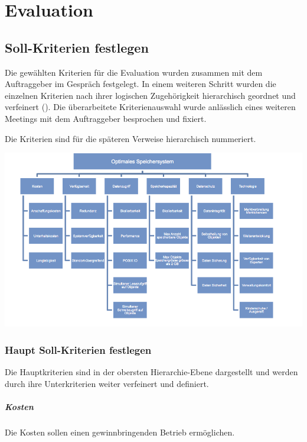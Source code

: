 \cleardoublepage
\chapter{Evaluation}

\section{Soll-Kriterien festlegen}
Die gewählten Kriterien für die Evaluation wurden zusammen mit dem Auftraggeber im Gespräch festgelegt. In einem weiteren Schritt wurden die einzelnen Kriterien nach ihrer logischen Zugehörigkeit hierarchisch geordnet und verfeinert (). Die überarbeitete Kriterienauswahl wurde anlässlich eines weiteren Meetings mit dem Auftraggeber besprochen und fixiert. 

Die Kriterien sind für die späteren Verweise hierarchisch nummeriert.

\begin{center}
\includegraphics[width=\linewidth, keepaspectratio = true]{media/ahp_kriterienbaum.png}
\end{center}

\subsection{Haupt Soll-Kriterien festlegen}
Die Hauptkriterien sind in der obersten Hierarchie-Ebene dargestellt und werden durch ihre Unterkriterien weiter verfeinert und definiert.
\setcounter{paragraph}{0}
\renewcommand\theparagraph{Soll-\arabic{paragraph}}
\paragraph{Kosten}\label{Soll-1}
Die Kosten sollen einen gewinnbringenden Betrieb ermöglichen. 

